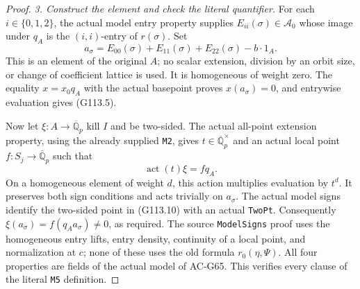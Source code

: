 \begin{proof}
\emph{3. Construct the element and check the literal quantifier.}
For each \(i\in\{0,1,2\}\), the actual model entry property
supplies \(E_{ii}(\sigma)\in\mathcal A_0\) whose image under
\(q_A\) is the \((i,i)\)-entry of \(r(\sigma)\).  Set
\[
        a_\sigma=E_{00}(\sigma)+E_{11}(\sigma)
                              +E_{22}(\sigma)-b\cdot1_A.
 \tag{G113.9}
\]
This is an element of the original \(A\); no scalar extension,
division by an orbit size, or change of coefficient lattice is
used.  It is homogeneous of weight zero.  The equality
\(x=x_0q_A\) with the actual basepoint proves \(x(a_\sigma)=0\),
and entrywise evaluation gives (G113.5).

Now let \(\xi:A\to\overline{\mathbb Q}_p\) kill \(I\) and
be two-sided.  The actual all-point extension property, using the
already supplied \texttt{M2}, gives \(t\in\overline{\mathbb Q}_p^\times\)
and an actual local point \(f:S_j\to\overline{\mathbb Q}_p\)
such that
\[
           \operatorname{act}(t)\xi=fq_A.
 \tag{G113.10}
\]
On a homogeneous element of weight \(d\), this action multiplies
evaluation by \(t^d\).  It preserves both sign conditions and
acts trivially on \(a_\sigma\).  The actual model signs identify
the two-sided point in (G113.10) with an actual \texttt{TwoPt}.
Consequently
\(\xi(a_\sigma)=f(q_Aa_\sigma)\ne0\), as required.  The
source \texttt{ModelSigns} proof uses the homogeneous entry lifts,
entry density, continuity of a local point, and normalization at
\(c\); none of these uses the old formula \(r_0(\eta,\Psi)\).
All four properties are fields of the actual model of AC-G65.
This verifies every clause of the literal \texttt{M5} definition.
\end{proof}


